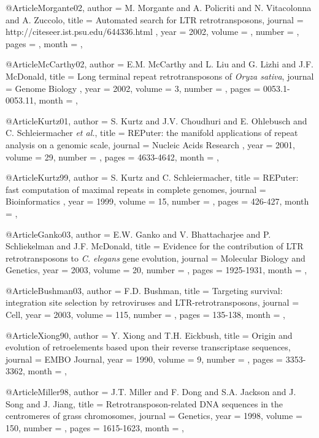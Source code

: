 @Article{Morgante02,
  author = 	 {M. Morgante and A. Policriti and N. Vitacolonna and A. Zuccolo},
  title = 	 {{Automated search for {LTR} retrotransposons}},
  journal =  {http://citeseer.ist.psu.edu/644336.html} ,
  year = 	 {2002},
  volume = 	 {},
  number = 	 {},
  pages = 	 {},
  month = 	 {},
}

@Article{McCarthy02,
  author = 	 {E.M. McCarthy and L. Liu and G. Lizhi and J.F. McDonald},
  title = 	 {Long terminal repeat retrotransposons of {\it Oryza sativa}},
  journal =  {Genome Biology} ,
  year = 	 {2002},
  volume = 	 {3},
  number = 	 {},
  pages = 	 {0053.1-0053.11},
  month = 	 {},
}

@Article{Kurtz01,
  author = 	 {S. Kurtz and J.V. Choudhuri and E. Ohlebusch and C. Schleiermacher {\it et al.}},
  title = 	 {{REPuter}: the manifold applications of repeat analysis on a genomic scale},
  journal =  {Nucleic Acids Research} ,
  year = 	 {2001},
  volume = 	 {29},
  number = 	 {},
  pages = 	 {4633-4642},
  month = 	 {},
}

@Article{Kurtz99,
  author = 	 {S. Kurtz and C. Schleiermacher},
  title = 	 {{REPuter}: fast computation of maximal repeats in complete genomes},
  journal =  {Bioinformatics} ,
  year = 	 {1999},
  volume = 	 {15},
  number = 	 {},
  pages = 	 {426-427},
  month = 	 {},
}


@Article{Ganko03,
  author = 	 {E.W. Ganko and V. Bhattacharjee and P. Schliekelman and J.F. McDonald},
  title = 	 {{Evidence for the contribution of {LTR} retrotransposons to {\it C. elegans} gene evolution}},
  journal =  {Molecular Biology and Genetics},
  year = 	 {2003},
  volume = 	 {20},
  number = 	 {},
  pages = 	 {1925-1931},
  month = 	 {},
}

@Article{Bushman03,
  author = 	 {F.D. Bushman},
  title = 	 {Targeting survival: integration site selection by retroviruses and {LTR}-retrotransposons},
  journal =  {Cell},
  year = 	 {2003},
  volume = 	 {115},
  number = 	 {},
  pages = 	 {135-138},
  month = 	 {},
}

@Article{Xiong90,
  author = 	 {Y. Xiong and T.H. Eickbush},
  title = 	 {Origin and evolution of retroelements based upon their reverse transcriptase sequences},
  journal =  {EMBO Journal},
  year = 	 {1990},
  volume = 	 {9},
  number = 	 {},
  pages = 	 {3353-3362},
  month = 	 {},
}

@Article{Miller98,
  author = 	 {J.T. Miller and F. Dong and S.A. Jackson and J. Song and J. Jiang},
  title = 	 {{Retrotransposon-related {DNA} sequences in the centromeres of grass chromosomes}},
  journal =  {Genetics},
  year = 	 {1998},
  volume = 	 {150},
  number = 	 {},
  pages = 	 {1615-1623},
  month = 	 {},
}


